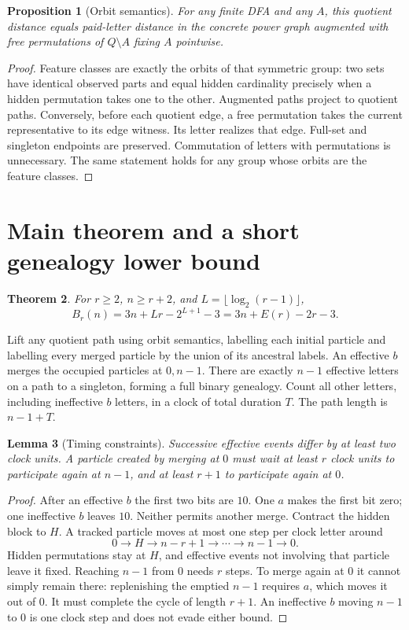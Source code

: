 \documentclass[11pt]{article}
\newtheorem{theorem}{Theorem}
\newtheorem{lemma}[theorem]{Lemma}
\newtheorem{proposition}[theorem]{Proposition}
\begin{document}
\begin{proposition}[Orbit semantics]
For any finite DFA and any $A$, this quotient distance equals paid-letter
distance in the concrete power graph augmented with free permutations of
$Q\setminus A$ fixing $A$ pointwise.
\end{proposition}
\begin{proof}
Feature classes are exactly the orbits of that symmetric group: two sets
have identical observed parts and equal hidden cardinality precisely when
a hidden permutation takes one to the other. Augmented paths project to
quotient paths. Conversely, before each quotient edge, a free permutation
takes the current representative to its edge witness. Its letter realizes
that edge. Full-set and singleton endpoints are preserved. Commutation of
letters with permutations is unnecessary. The same statement holds for any
group whose orbits are the feature classes.
\end{proof}

\section{Main theorem and a short genealogy lower bound}
\begin{theorem}\label{thm:main}
For $r\ge2$, $n\ge r+2$, and $L=\lfloor\log_2(r-1)\rfloor$,
\[
B_r(n)=3n+Lr-2^{L+1}-3=3n+E(r)-2r-3.
\]
\end{theorem}

Lift any quotient path using orbit semantics, labelling each initial
particle and labelling every merged particle by the union of its ancestral
labels. An effective $b$ merges the occupied particles at $0,n-1$.
There are exactly $n-1$ effective letters on a path to a singleton, forming
a full binary genealogy. Count all other letters, including ineffective
$b$ letters, in a clock of total duration $T$. The path length is $n-1+T$.

\begin{lemma}[Timing constraints]\label{lem:timing}
Successive effective events differ by at least two clock units. A particle
created by merging at $0$ must wait at least $r$ clock units to participate
again at $n-1$, and at least $r+1$ to participate again at $0$.
\end{lemma}
\begin{proof}
After an effective $b$ the first two bits are $10$. One $a$ makes the first
bit zero; one ineffective $b$ leaves $10$. Neither permits another merge.
Contract the hidden block to $H$. A tracked particle moves at most one
step per clock letter around
\[
0\longrightarrow H\longrightarrow n-r+1\longrightarrow\cdots
\longrightarrow n-1\longrightarrow0.
\]
Hidden permutations stay at $H$, and effective events not involving that
particle leave it fixed. Reaching $n-1$ from $0$ needs $r$ steps. To merge
again at $0$ it cannot simply remain there: replenishing the emptied $n-1$
requires $a$, which moves it out of $0$. It must complete the cycle of
length $r+1$. An ineffective $b$ moving $n-1$ to $0$ is one clock step and
does not evade either bound.
\end{proof}
\end{document}
